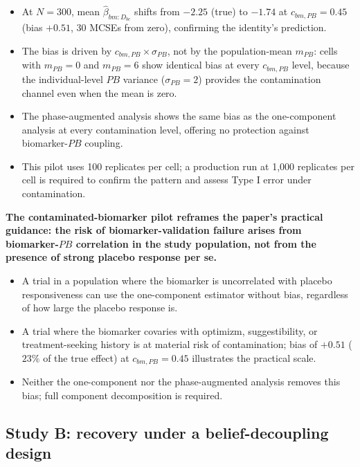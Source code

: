 \documentclass[
  11pt,
]{article}
\begin{document}
\begin{itemize}\setlength{\itemsep}{2pt}\setlength{\parskip}{0pt}
\item At $N=300$, mean $\hat\beta_{bm:D_{bc}}$ shifts from
  $-2.25$ (true) to $-1.74$ at $c_{bm,PB}=0.45$ (bias $+0.51$,
  30 MCSEs from zero), confirming the identity's
  prediction.
\item The bias is driven by $c_{bm,PB} \times \sigma_{PB}$, not
  by the population-mean $m_{PB}$: cells with $m_{PB}=0$ and
  $m_{PB}=6$ show identical bias at every $c_{bm,PB}$ level,
  because the individual-level $PB$ variance ($\sigma_{PB}=2$)
  provides the contamination channel even when the mean is zero.
\item The phase-augmented analysis shows the same bias as the
  one-component analysis at every contamination level, offering
  no protection against biomarker-$PB$ coupling.
\item This pilot uses 100 replicates per cell; a production run
  at 1,000 replicates per cell is required to confirm the pattern
  and assess Type I error under contamination.
\end{itemize}

\textbf{The contaminated-biomarker pilot reframes the paper's
practical guidance: the risk of biomarker-validation failure
arises from biomarker-$PB$ correlation in the study population,
not from the presence of strong placebo response per se.}

\begin{itemize}\setlength{\itemsep}{2pt}\setlength{\parskip}{0pt}
\item A trial in a population where the biomarker is uncorrelated
  with placebo responsiveness can use the one-component estimator
  without bias, regardless of how large the placebo response is.
\item A trial where the biomarker covaries with optimizm,
  suggestibility, or treatment-seeking history is at material
  risk of contamination; bias of $+0.51$ ($23\%$ of the true
  effect) at $c_{bm,PB}=0.45$ illustrates the practical scale.
\item Neither the one-component nor the phase-augmented analysis
  removes this bias; full component decomposition is required.
\end{itemize}

\subsection{Study B: recovery under a belief-decoupling design}\label{study-b-recovery-under-a-belief-decoupling-design}
\end{document}
